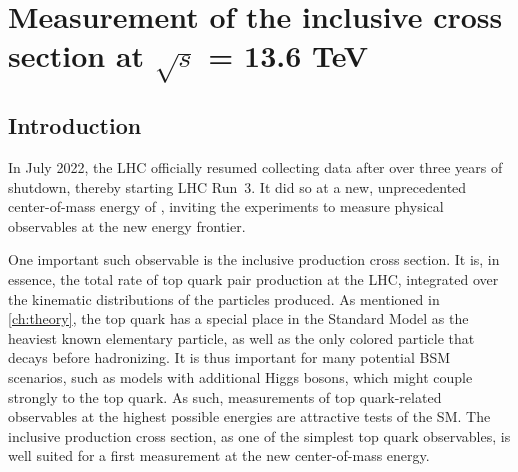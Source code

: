 \chapter{Measurement of the inclusive \ttbartitle cross section at \texorpdfstring{$\sqrt{s}$}{sqrt(s)} = 13.6 TeV}
\label{ch:ttxs}


\section{Introduction}



In July 2022, the LHC officially resumed collecting data after over three years of shutdown, thereby starting LHC Run~3. It did so at a new, unprecedented center-of-mass energy of \sqrtsRIII, inviting the experiments to measure physical observables at the new energy frontier.

One important such observable is the inclusive \ttbar production cross section. It is, in essence, the total rate of top quark pair production at the LHC, integrated over the kinematic distributions of the particles produced. As mentioned in \cref{ch:theory}, the top quark has a special place in the Standard Model as the heaviest known elementary particle, as well as the only colored particle that decays before hadronizing. 
It is thus important for many potential BSM scenarios, such as models with additional Higgs bosons, which might couple strongly to the top quark. 
As such, measurements of top quark-related observables at the highest possible energies are attractive tests of the SM. The inclusive \ttbar production cross section, as one of the simplest top quark observables, is well suited for a first measurement at the new center-of-mass energy.

